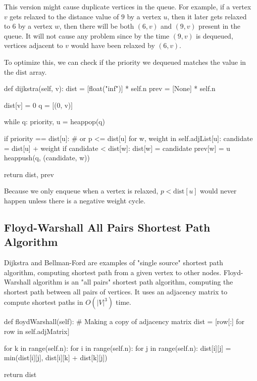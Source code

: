 \noindent This version might cause duplicate vertices in the queue.
For example, if a vertex $v$ gets relaxed to the distance value of $9$ by a vertex $u$, then it later gets relaxed to $6$ by a vertex $w$, then there will be both $(6, v)$ and $(9, v)$ present in the queue.
It will not cause any problem since by the time $(9, v)$ is dequeued, vertices adjacent to $v$ would have been relaxed by $(6, v)$.

\noindent To optimize this, we can check if the priority we dequeued matches the value in the $\textrm{dist}$ array.

\begin{python}
    def dijkstra(self, v):
        dist = [float("inf")] * self.n
        prev = [None] * self.n

        dist[v] = 0
        q = [(0, v)]

        while q:
            priority, u = heappop(q)

            if priority == dist[u]:  # or p <= dist[u]
                for w, weight in self.adjList[u]:
                    candidate = dist[u] + weight
                    if candidate < dist[w]:
                        dist[w] = candidate
                        prev[w] = u
                        heappush(q, (candidate, w))

        return dist, prev
\end{python}

\noindent Because we only enqueue when a vertex is relaxed, $p < \textrm{dist}[u]$ would never happen unless there is a negative weight cycle.

\subsection{Floyd-Warshall All Pairs Shortest Path Algorithm}

Dijkstra and Bellman-Ford are examples of "single source" shortest path algorithm, computing shortest path from a given vertex to other nodes.
Floyd-Warshall algorithm is an "all pairs" shortest path algorithm, computing the shortest path between all pairs of vertices.
It uses an adjacency matrix to compute shortest paths in $O(|V|^3)$ time.

\begin{python}
    def floydWarshall(self):
        # Making a copy of adjacency matrix
        dist = [row[:] for row in self.adjMatrix]

        for k in range(self.n):
            for i in range(self.n):
                for j in range(self.n):
                    dist[i][j] = min(dist[i][j], dist[i][k] + dist[k][j])

        return dist
\end{python}

